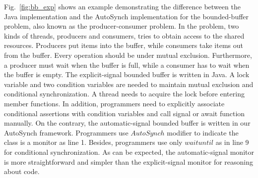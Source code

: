 \documentclass[preprint]{sigplanconf}
\begin{document}
Fig.~\ref{fig:bb_exp} shows an example demonstrating the difference between 
the Java implementation and the AutoSynch implementation for the 
bounded-buffer problem, also known as the producer-consumer problem. 
In the problem, two kinds of threads, producers and consumers, tries to obtain 
access to the shared resources. Producers put items 
into the buffer, while consumers take items out from the buffer. Every 
operation should be under mutual exclusion. Furthermore, a producer must wait  
when the buffer is full, while a consumer has to wait when the 
buffer is empty. The explicit-signal bounded buffer is written in Java. A 
lock variable and two condition variables are needed to maintain mutual exclusion 
and conditional synchronization. A thread needs to acquire the lock before entering member
functions. In addition, programmers need to explicitly associate conditional 
assertions with condition variables and call signal or await function manually.
On the contrary, 
the automatic-signal bounded buffer is written in our AutoSynch framework.
Programmers use $AutoSynch$ modifier to indicate the class is a monitor as line 
1. Besides, programmers use only $waituntil$ as in line 9 for conditional
synchronization. As can be expected, the automatic-signal monitor is
more straightforward and simpler than the explicit-signal monitor for
reasoning about code.
\end{document}
